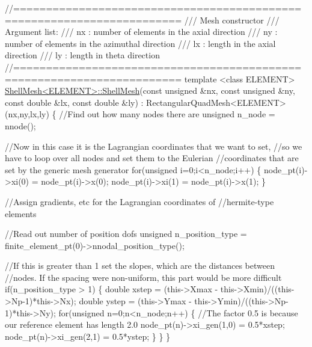 \begin{DoxyCodeInclude}
\textcolor{comment}{//=======================================================================}\textcolor{comment}{}
\textcolor{comment}{/// Mesh constructor}
\textcolor{comment}{/// Argument list:}
\textcolor{comment}{/// nx  : number of elements in the axial direction}
\textcolor{comment}{/// ny : number of elements in the azimuthal direction}
\textcolor{comment}{/// lx  : length in the axial direction}
\textcolor{comment}{/// ly  : length in theta direction}
\textcolor{comment}{}\textcolor{comment}{//=======================================================================}
\textcolor{keyword}{template} <\textcolor{keyword}{class} ELEMENT>
\hyperlink{classShellMesh_a6ce8404f69fa3f4c10dac5c18cff0699}{ShellMesh<ELEMENT>::ShellMesh}(\textcolor{keyword}{const} \textcolor{keywordtype}{unsigned} &nx, 
                              \textcolor{keyword}{const} \textcolor{keywordtype}{unsigned} &ny,
                              \textcolor{keyword}{const} \textcolor{keywordtype}{double} &lx, 
                              \textcolor{keyword}{const} \textcolor{keywordtype}{double} &ly) :
 RectangularQuadMesh<ELEMENT>(nx,ny,lx,ly)
\{
 \textcolor{comment}{//Find out how many nodes there are}
 \textcolor{keywordtype}{unsigned} n\_node = nnode();
 
 \textcolor{comment}{//Now in this case it is the Lagrangian coordinates that we want to set,}
 \textcolor{comment}{//so we have to loop over all nodes and set them to the Eulerian}
 \textcolor{comment}{//coordinates that are set by the generic mesh generator}
 \textcolor{keywordflow}{for}(\textcolor{keywordtype}{unsigned} i=0;i<n\_node;i++)
  \{
   node\_pt(i)->xi(0) = node\_pt(i)->x(0);
   node\_pt(i)->xi(1) = node\_pt(i)->x(1);
  \}
 

 \textcolor{comment}{//Assign gradients, etc for the Lagrangian coordinates of }
 \textcolor{comment}{//hermite-type elements}
 
 \textcolor{comment}{//Read out number of position dofs}
 \textcolor{keywordtype}{unsigned} n\_position\_type = finite\_element\_pt(0)->nnodal\_position\_type();

 \textcolor{comment}{//If this is greater than 1 set the slopes, which are the distances between }
 \textcolor{comment}{//nodes. If the spacing were non-uniform, this part would be more difficult}
 \textcolor{keywordflow}{if}(n\_position\_type > 1)
  \{
   \textcolor{keywordtype}{double} xstep = (this->Xmax - this->Xmin)/((this->Np-1)*this->Nx);
   \textcolor{keywordtype}{double} ystep = (this->Ymax - this->Ymin)/((this->Np-1)*this->Ny);
   \textcolor{keywordflow}{for}(\textcolor{keywordtype}{unsigned} n=0;n<n\_node;n++)
    \{
     \textcolor{comment}{//The factor 0.5 is because our reference element has length 2.0}
     node\_pt(n)->xi\_gen(1,0) = 0.5*xstep;
     node\_pt(n)->xi\_gen(2,1) = 0.5*ystep;
    \}
  \}
\}



\end{DoxyCodeInclude}
